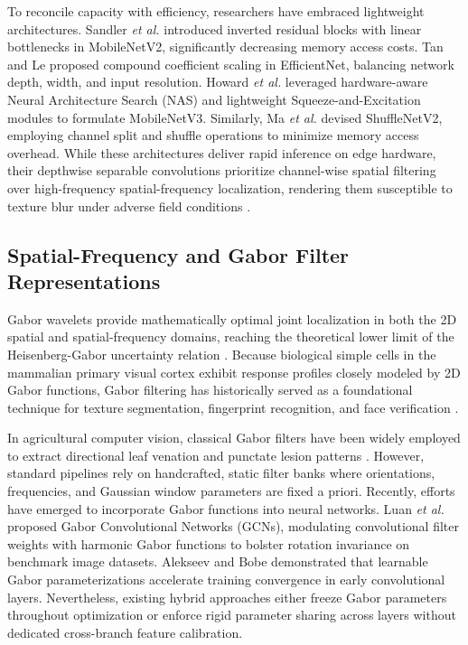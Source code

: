 To reconcile capacity with efficiency, researchers have embraced lightweight architectures. Sandler \textit{et al.} \cite{sandler2018mobilenetv2} introduced inverted residual blocks with linear bottlenecks in MobileNetV2, significantly decreasing memory access costs. Tan and Le \cite{tan2019efficientnet} proposed compound coefficient scaling in EfficientNet, balancing network depth, width, and input resolution. Howard \textit{et al.} \cite{howard2019searching} leveraged hardware-aware Neural Architecture Search (NAS) and lightweight Squeeze-and-Excitation modules to formulate MobileNetV3. Similarly, Ma \textit{et al.} \cite{ma2018shufflenet} devised ShuffleNetV2, employing channel split and shuffle operations to minimize memory access overhead. While these architectures deliver rapid inference on edge hardware, their depthwise separable convolutions prioritize channel-wise spatial filtering over high-frequency spatial-frequency localization, rendering them susceptible to texture blur under adverse field conditions \cite{ahmed2022field}.

\subsection{Spatial-Frequency and Gabor Filter Representations}
Gabor wavelets provide mathematically optimal joint localization in both the 2D spatial and spatial-frequency domains, reaching the theoretical lower limit of the Heisenberg-Gabor uncertainty relation \cite{daugman1985uncertainty}. Because biological simple cells in the mammalian primary visual cortex exhibit response profiles closely modeled by 2D Gabor functions, Gabor filtering has historically served as a foundational technique for texture segmentation, fingerprint recognition, and face verification \cite{manjunath1996texture}.

In agricultural computer vision, classical Gabor filters have been widely employed to extract directional leaf venation and punctate lesion patterns \cite{wang2021gabor}. However, standard pipelines rely on handcrafted, static filter banks where orientations, frequencies, and Gaussian window parameters are fixed a priori. Recently, efforts have emerged to incorporate Gabor functions into neural networks. Luan \textit{et al.} \cite{luan2018gabor} proposed Gabor Convolutional Networks (GCNs), modulating convolutional filter weights with harmonic Gabor functions to bolster rotation invariance on benchmark image datasets. Alekseev and Bobe \cite{alekseev2019gabor} demonstrated that learnable Gabor parameterizations accelerate training convergence in early convolutional layers. Nevertheless, existing hybrid approaches either freeze Gabor parameters throughout optimization or enforce rigid parameter sharing across layers without dedicated cross-branch feature calibration.

